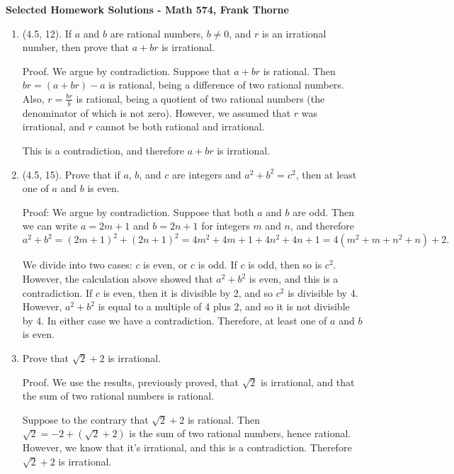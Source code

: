 \documentclass[12pt]{amsart}
\begin{document}
\setlength{\topmargin}{-12mm}






\begin{center}{\bf Selected Homework Solutions - Math 574, Frank Thorne}
\end{center}
\begin{enumerate}[1.]
\item(4.5, 12). If $a$ and $b$ are rational numbers, $b \neq 0$, and $r$ is an irrational number,
then prove that $a + br$ is irrational.

Proof. We argue by contradiction. Suppose that $a + br$ is rational. Then $br = (a + br) - a$ is rational,
being a difference of two rational numbers. Also, $r = \frac{br}{b}$ is rational, being a quotient of two
rational numbers (the denominator of which is not zero). However, we assumed that $r$ was irrational,
and $r$ cannot be both rational and irrational.

This is a contradiction, and therefore $a + br$ is irrational.

\item(4.5, 15). Prove that if $a$, $b$, and $c$ are integers and $a^2 + b^2 = c^2$, then at least one of $a$ and
$b$ is even.

Proof: We argue by contradiction. Suppose that both $a$ and $b$ are odd. Then we can write $a = 2m + 1$ and
$b = 2n + 1$ for integers $m$ and $n$, and therefore
$$a^2 + b^2 = (2m + 1)^2 + (2n + 1)^2 = 4m^2 + 4m + 1 + 4n^2 + 4n + 1 = 4(m^2 + m + n^2 + n) + 2.$$

We divide into two cases: $c$ is even, or $c$ is odd. If $c$ is odd, then so is $c^2$. However, the calculation above
showed that $a^2 + b^2$ is even, and this is a contradiction. If $c$ is even, then it is divisible by 2, and so $c^2$ is divisible
by 4. However, $a^2 + b^2$ is equal to a multiple of 4 plus 2, and so it is not divisible by 4. In either case we have a contradiction.
Therefore, at least one of $a$ and $b$ is even.

\item Prove that $\sqrt{2} + 2$ is irrational.

Proof. We use the results, previously proved, that $\sqrt{2}$ is irrational, and that the sum of two
rational numbers is rational.

Suppose to the contrary that $\sqrt{2} + 2$ is rational. Then $\sqrt{2} = -2 + (\sqrt{2} + 2)$
is the sum of two rational numbers, hence rational. However, we know that it's irrational,
and this is a contradiction. Therefore $\sqrt{2} + 2$ is irrational.


\end{enumerate}
\end{document}
